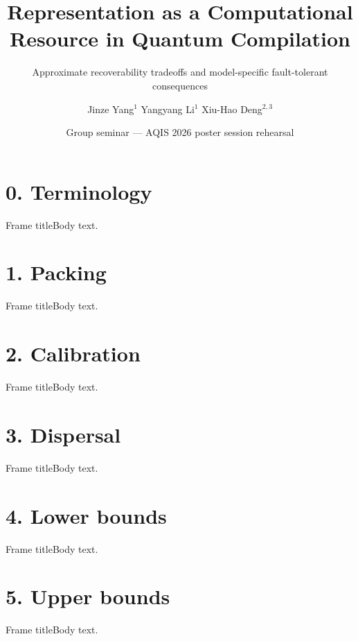 \documentclass[aspectratio=169,10pt]{beamer}
\title[Representation as a Computational Resource]%
      {Representation as a Computational Resource in Quantum Compilation}
\subtitle{Approximate recoverability tradeoffs and model-specific
          fault-tolerant consequences}
\author[Yang, Li, Deng]%
       {Jinze Yang${}^1$ \quad Yangyang Li${}^1$ \quad Xiu-Hao Deng${}^{2,3}$}
\institute[Xidian]%
          {\footnotesize ${}^1$ Xidian University \quad
           ${}^2$ Shenzhen International Quantum Academy \quad
           ${}^3$ Hefei National Laboratory}
\date[AQIS 2026]{Group seminar --- AQIS 2026 poster session rehearsal}
\theoremstyle{definition}
\begin{document}
\section{0. Terminology}
\begin{frame}{Frame title}Body text.\end{frame}
\section{1. Packing}
\begin{frame}{Frame title}Body text.\end{frame}
\section{2. Calibration}
\begin{frame}{Frame title}Body text.\end{frame}
\section{3. Dispersal}
\begin{frame}{Frame title}Body text.\end{frame}
\section{4. Lower bounds}
\begin{frame}{Frame title}Body text.\end{frame}
\section{5. Upper bounds}
\begin{frame}{Frame title}Body text.\end{frame}
\end{document}
